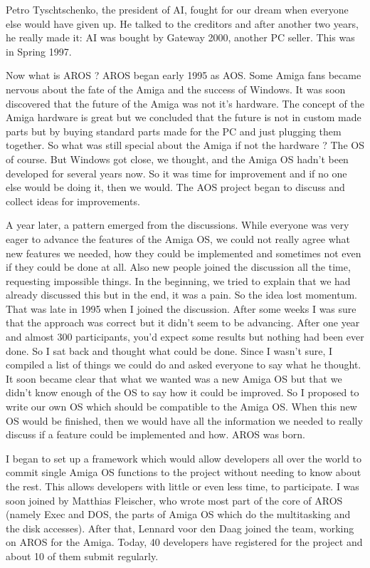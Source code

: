 Petro Tyschtschenko, the president of AI, fought for our dream when
everyone else would have given up. He talked to the creditors and after
another two years, he really made it: AI was bought by Gateway 2000,
another PC seller. This was in Spring 1997.

Now what is AROS ? AROS began early 1995 as AOS. Some Amiga fans
became nervous about the fate of the Amiga and the success of
Windows. It was soon discovered that the future of the Amiga
was not it's hardware. The concept of the Amiga hardware is great but
we concluded that the future is not in custom made parts but by buying
standard parts made for the PC and just plugging them together. So what was
still special about the Amiga if not the hardware ? The OS of course. But
Windows got close, we thought, and the Amiga OS hadn't been developed for
several years now. So it was time for improvement and if no one else
would be doing it, then we would. The AOS project began to discuss and
collect ideas for improvements.

A year later, a pattern emerged from the discussions. While everyone
was very eager to advance the features of the Amiga OS, we could not
really agree what new features we needed, how they could be implemented
and sometimes not even if they could be done at all. Also new people
joined the discussion all the time, requesting impossible things. In the
beginning, we tried to explain that we had already discussed this but in
the end, it was a pain. So the idea lost momentum. That was late in 1995
when I joined the discussion. After some weeks I was sure that the approach
was correct but it didn't seem to be advancing. After one year and almost
300 participants, you'd expect some results but nothing had been ever done.
So I sat back and thought what could be done. Since I wasn't sure, I
compiled a list of things we could do and asked everyone to say what he
thought. It soon became clear that what we wanted was a new Amiga OS but
that we didn't know enough of the OS to say how it could be improved.
So I proposed to write our own OS which should be compatible to the
Amiga OS. When this new OS would be finished, then we would have all the
information we needed to really discuss if a feature could be implemented
and how. AROS was born.

I began to set up a framework which would allow developers all over the
world to commit single Amiga OS functions to the project without needing
to know about the rest. This allows developers with little or even less
time, to participate. I was soon joined by Matthias Fleischer, who
wrote most part of the core of AROS (namely Exec and DOS, the parts of
Amiga OS which do the multitasking and the disk accesses). After that,
Lennard voor den Daag joined the team, working on AROS for the Amiga.
Today, 40 developers have registered for the project and about 10 of them
submit regularly.

